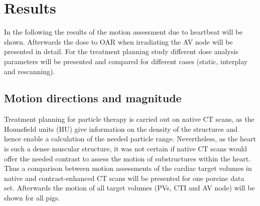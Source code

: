 \documentclass[type=dr, dr=rernat, accentcolor=tud7b,colorbacktitle, bigchapter, openright, twoside, 12pt ]{tudthesis}
\begin{document}

\section{Results}

In the following the results of the motion assessment due to heartbeat will be shown. Afterwards the dose to OAR when irradiating the AV node 
will be presented in detail. For the treatment planning study different dose analysis parameters will be presented and compared for different 
cases (static, interplay and rescanning). 

\subsection{Motion directions and magnitude}

Treatment planning for particle therapy is carried out on native CT scans, as the Hounsfield units (HU) give information on the density of the 
structures and hence enable a calculation of the needed particle range. 
Nevertheless, as the heart is such a dense muscular structure, it was not certain if native CT scans would offer the needed contrast 
to assess the motion of substructures within the heart. Thus a comparison between motion assessments of the cardiac target volumes 
in native and contrast-enhanced CT scans will be presented for one porcine data set. Afterwards the motion of all target volumes (PVs, CTI and 
AV node) will be shown for all pigs. 
\end{document}

